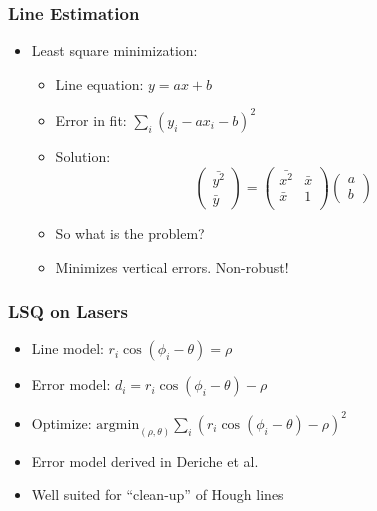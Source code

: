 \documentclass[10pt]{beamer}
\begin{document}
\begin{frame}
  \frametitle{Line Estimation}
  \begin{itemize}
  \item Least square minimization:
    \begin{itemize}\setlength{\itemsep}{0pt}
    \item Line equation: $y=a x + b$
    \item Error in fit: $\sum_i (y_i - a x_i - b)^2$
    \item Solution: \[
      \left( \begin{array}{c} \bar{y^2}\\ \bar{y} \end{array}
      \right) = \left( \begin{array}{cc}
          \bar{x^2} & \bar{x} \\
          \bar{x}   & 1\\ \end{array} \right) \left(
        \begin{array}{c} a \\ b \end{array} \right)
      \]
    \item So what is the problem? \pause
    \item Minimizes vertical errors. Non-robust!
    \end{itemize}
  \end{itemize}
\end{frame}

\begin{frame}
  \frametitle{LSQ on Lasers}
  \begin{itemize}
  \item Line model: $r_i \cos(\phi_i - \theta) = \rho$
  \item Error model: $d_i = r_i \cos(\phi_i - \theta) - \rho$
  \item Optimize: $ \textrm{argmin}_{(\rho,\theta)} \sum_i (r_i
    \cos(\phi_i - \theta) - \rho)^2 $
  \item Error model derived in Deriche et al.~\cite{deriche_noisy_1992}
  \item Well suited for ``clean-up'' of Hough lines
  \end{itemize}
\end{frame}
\end{document}
